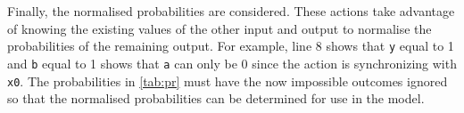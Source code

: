 \documentclass[report.tex]{subfiles}
\begin{document}
Finally, the normalised probabilities are considered. These actions take
advantage of knowing the existing values of the other input and output to
normalise the probabilities of the remaining output. For example, line 8 shows
that \texttt{y} equal to 1 and \texttt{b} equal to 1 shows that \texttt{a} can
only be 0 since the action is synchronizing with \texttt{x0}. The probabilities
in \ref{tab:pr} must have the now impossible outcomes ignored so that the
normalised probabilities can be determined for use in the model.


\newpage
\end{document}
